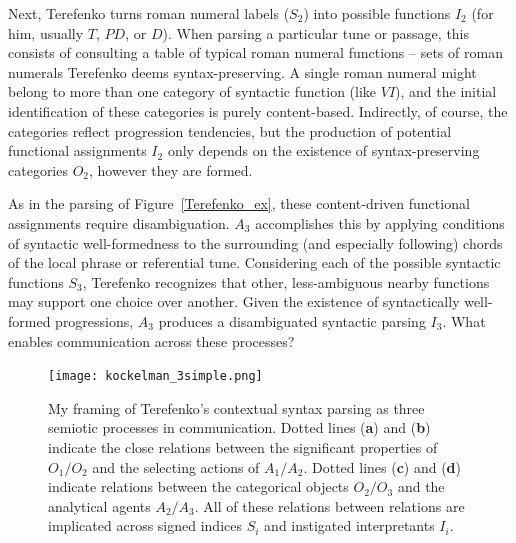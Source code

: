 Next, Terefenko turns roman numeral labels ($S_2$) into possible functions $I_2$ (for him, usually $T$, $PD$, or $D$).  When parsing a particular tune or passage, this consists of consulting a table of typical roman numeral functions -- sets of roman numerals Terefenko deems syntax-preserving.  A single roman numeral might belong to more than one category of syntactic function (like $VI$), and the initial identification of these categories is purely content-based.  Indirectly, of course, the categories reflect progression tendencies, but the production of potential functional assignments $I_2$ only depends on the existence of syntax-preserving categories $O_2$, however they are formed.

As in the parsing of Figure~\ref{Terefenko_ex}, these content-driven functional assignments require disambiguation.  $A_3$ accomplishes this by applying conditions of syntactic well-formedness to the surrounding (and especially following) chords of the local phrase or referential tune.  Considering each of the possible syntactic functions $S_3$, Terefenko recognizes that other, less-ambiguous nearby functions may support one choice over another.  Given the existence of syntactically well-formed progressions, $A_3$ produces a disambiguated syntactic parsing $I_3$.  What enables communication across these processes?

\begin{figure}
	\centering
	\caption{My framing of Terefenko's contextual syntax parsing as three semiotic processes in communication.  Dotted lines (\textbf{a}) and (\textbf{b}) indicate the close relations between the significant properties of $O_1 / O_2$ and the selecting actions of $A_1 / A_2$.  Dotted lines (\textbf{c}) and (\textbf{d}) indicate relations between the categorical objects $O_2 / O_3$ and the analytical agents $A_2 / A_3$.  All of these relations between relations are implicated across signed indices $S_i$ and instigated interpretants $I_i$.}%
	\label{k_t}
	\texttt{[image: kockelman\_3simple.png]}
\end{figure}

